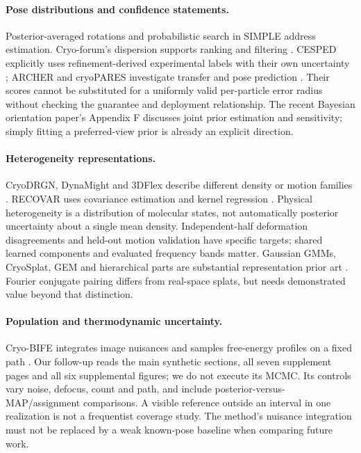 \paragraph{Pose distributions and confidence statements.}
Posterior-averaged rotations \citep{bayespose2026} and probabilistic search
in SIMPLE \citep{simple2025} address estimation. Cryo-forum's dispersion
supports ranking and filtering \citep{cryoforum2023}. CESPED explicitly
uses refinement-derived experimental labels with their own uncertainty
\citep{cesped2024}; ARCHER and cryoPARES investigate transfer and pose
prediction \citep{archer2026,cryopares2026}. Their scores cannot be
substituted for a uniformly valid per-particle error radius without checking
the guarantee and deployment relationship. The recent Bayesian orientation
paper's Appendix F discusses joint prior estimation and sensitivity;
simply fitting a preferred-view prior is already an explicit direction.

\paragraph{Heterogeneity representations.}
CryoDRGN, DynaMight and 3DFlex describe different density or motion families
\citep{zhong2021,dynamight2024,flex2023}. RECOVAR uses covariance estimation
and kernel regression \citep{recovar2025}. Physical heterogeneity is a
distribution of molecular states, not automatically posterior uncertainty
about a single mean density. Independent-half deformation disagreements
and held-out motion validation have specific targets; shared learned
components and evaluated frequency bands matter. Gaussian GMMs, CryoSplat,
GEM and hierarchical parts are substantial representation prior art
\citep{chen2021,chen2025,qu2025,shekar2025}. Fourier conjugate pairing differs
from real-space splats, but needs demonstrated value beyond that distinction.

\paragraph{Population and thermodynamic uncertainty.}
Cryo-BIFE integrates image nuisances and samples free-energy profiles on a
fixed path \citep{cryobife2021}. Our follow-up reads the main synthetic
sections, all seven supplement pages and all six supplemental figures;
we do not execute its MCMC. Its controls vary noise, defocus, count and path,
and include posterior-versus-MAP/assignment comparisons. A visible reference
outside an interval in one realization is not a frequentist coverage study.
The method's nuisance integration must not be replaced by a weak known-pose
baseline when comparing future work.

